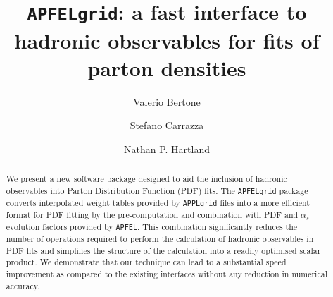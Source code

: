 \documentclass[preprint,12pt]{elsarticle}
\begin{document}
\begin{frontmatter}



\title{{\tt APFELgrid}: a fast interface to hadronic observables for
  fits of parton densities}


\author[a]{Valerio Bertone}
\author[b]{Stefano Carrazza}
\author[a]{Nathan P. Hartland}

\address[a]{Rudolf Peierls Centre for Theoretical Physics,\\ 1 Keble Road, University of Oxford, OX1 3NP, Oxford, UK}
\address[b]{TH Unit, CERN, CH-1211 Geneva 23, Switzerland}

\begin{abstract}
We present a new software package designed to aid the inclusion of hadronic
observables into Parton Distribution Function (PDF) fits. The {\tt APFELgrid} package
converts interpolated weight tables provided by {\tt APPLgrid} files into a more efficient
format for PDF fitting by the pre-computation and combination with PDF and $\alpha_s$ evolution factors provided
by {\tt APFEL}. This combination significantly reduces the number of operations required to perform the calculation
of hadronic observables in PDF fits and simplifies the structure of the calculation into
a readily optimised scalar product. We demonstrate that our technique
can lead to a substantial speed improvement as compared to the
existing interfaces without any reduction in numerical accuracy.


\end{abstract}
\end{frontmatter}
\end{document}
